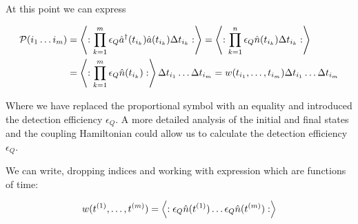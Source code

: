 \documentclass[12pt]{article}
\newcommand{\ep}{\epsilon}
\begin{document}
At this point we can express

\begin{align}
\mathcal{P}(i_1 \ldots i_m) &= \Braket{:\prod_{k=1}^m \ep_Q \hat{a}^{\dag}(t_{i_k})\hat{a}(t_{i_k})\Delta t_{i_k} :} = \Braket{:\prod_{k=1}^n \ep_Q \hat{n}(t_{i_k})\Delta t_{i_k} :}\\
&= \Braket{:\prod_{k=1}^m \ep_Q \hat{n}(t_{i_k}):} \Delta t_{i_1} \ldots \Delta t_{i_m} = w(t_{i_1},\ldots ,t_{i_m}) \Delta t_{i_1} \ldots \Delta t_{i_m}
\end{align}

Where we have replaced the proportional symbol with an equality and introduced the detection efficiency $\ep_Q$. A more detailed analysis of the initial and final states and the coupling Hamiltonian could allow us to calculate the detection efficiency $\ep_Q$.

We can write, dropping indices and working with expression which are functions of time:

\begin{align}
w(t^{(1)},\ldots,t^{(m)}) = \Braket{:\ep_Q\hat{n}(t^{(1)}) \ldots \ep_Q \hat{n}(t^{(m)}) :}
\end{align}

\printbibliography
\end{document}
